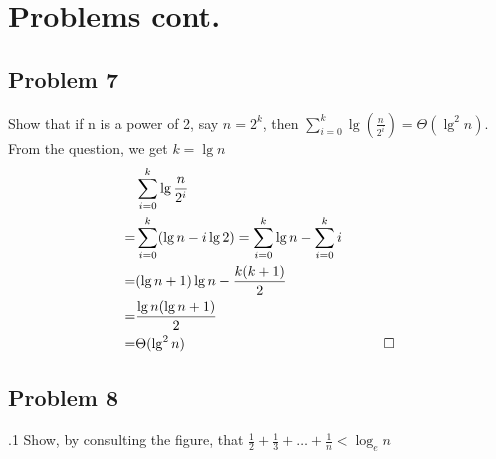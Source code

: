 \documentclass[
               handout,
               ]{beamer}
\begin{document}
\section{Problems cont.}

    \subsection{Problem 7}
    
        \begin{frame}[c]{\subsecname}
            Show that if n is a power of 2, say $n=2^k$, then $\sum^k_{i=0}\lg(\frac{n}{2^i})=\Theta(\lg^2{n})$.\\\pause
            From the question, we get $k=\lg{n}$
            \begin{align*}
            &\sum_{i=0}^{k}\lg{\frac{n}{2^i}}\\
            =&\sum_{i=0}^{k}(\lg{n}-i\lg{2})=\sum_{i=0}^{k}\lg{n}-\sum_{i=0}^{k}i\\
            =&(\lg{n}+1)\lg{n}-\frac{k(k+1)}{2}\\
            =&\frac{\lg{n}(\lg{n}+1)}{2}\\
            =&\Theta(\lg^2{n}) &\qed
            \end{align*}
        \end{frame}



    \subsection{Problem 8}
    
        \begin{frame}[c]{\subsecname.1}
            Show, by consulting the figure, that $\frac{1}{2}+\frac{1}{3}+\ldots+\frac{1}{n}<\log_e{n}$\\
        \end{frame}
    
\end{document}
